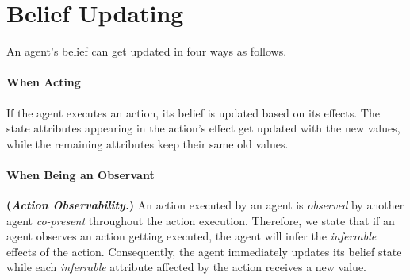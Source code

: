 \documentclass[letterpaper]{article} %
\begin{document}
\section{Belief Updating}
An agent's belief can get updated in four ways as follows. 

\paragraph{When Acting}
If the agent executes an action, its belief is updated based on its effects. The state attributes appearing in the action's effect get updated with the new values, while the remaining attributes keep their same old values.

\paragraph{When Being an Observant} \textbf{(\textit{Action Observability.})}
An action executed by an agent is \textit{observed} by another agent \emph{co-present} throughout the action execution. Therefore, we state that if an agent observes an action getting executed, the agent will infer the \textit{inferrable} effects of the action.
Consequently, the agent immediately updates its belief state while each \textit{inferrable} attribute affected by the action receives a new value.  
\end{document}

